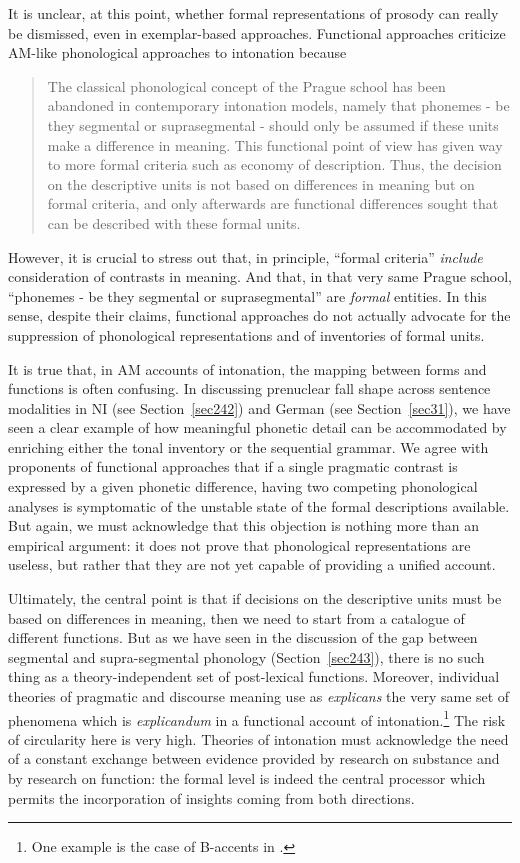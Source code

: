 It is unclear, at this point, whether formal representations of prosody can really be dismissed, even in exemplar-based approaches. Functional approaches criticize AM-like phonological approaches to intonation because \begin{quote}The classical phonological concept of the Prague school has been abandoned in contemporary intonation models, namely that phonemes - be they segmental or suprasegmental - should only be assumed if these units make a difference in meaning. This functional point of view has given way to more formal criteria such as economy of description. Thus, the decision on the descriptive units is not based on differences in meaning but on formal criteria, and only afterwards are functional differences sought that can be described with these formal units. \cite[§1.1]{batliner2005prosodic}\end{quote}
However, it is crucial to stress out that, in principle, ``formal criteria'' \textit{include} consideration of contrasts in meaning. And that, in that very same Prague school, ``phonemes - be they segmental or suprasegmental'' are \textit{formal} entities. In this sense, despite their claims, functional approaches do not actually advocate for the suppression of phonological representations and of inventories of formal units. 

It is true that, in AM accounts of intonation, the mapping between forms and functions is often confusing. In discussing prenuclear fall shape across sentence modalities in NI (see Section~\ref{sec242}) and German (see Section~\ref{sec31}), we have seen a clear example of how meaningful phonetic detail can be accommodated by enriching either the tonal inventory or the sequential grammar. We agree with proponents of functional approaches that if a single pragmatic contrast is expressed by a given phonetic difference, having two competing phonological analyses is symptomatic of the unstable state of the formal descriptions available. But again, we must acknowledge that this objection is nothing more than an empirical argument: it does not prove that phonological representations are useless, but rather that they are not yet capable of providing a unified account. 

Ultimately, the central point is that if decisions on the descriptive units must be based on differences in meaning, then we need to start from a catalogue of different functions. But as we have seen in the discussion of the gap between segmental and supra-segmental phonology (Section~\ref{sec243}), there is no such thing as a theory-independent set of post-lexical functions. Moreover, individual theories of pragmatic and discourse meaning use as \textit{explicans} the very same set of phenomena which is \textit{explicandum} in a functional account of intonation.\footnote{One example is the case of B-accents in \citet{jackendoff1972semantic}.} The risk of circularity here is very high. Theories of intonation must acknowledge the need of a constant exchange between evidence provided by research on substance and by research on function: the formal level is indeed the central processor which permits the incorporation of insights coming from both directions.

